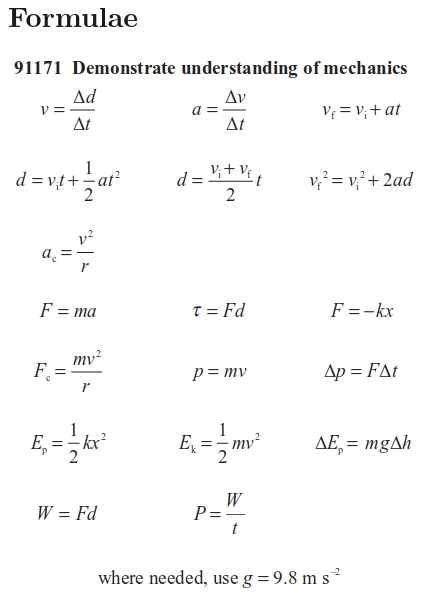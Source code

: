 \documentclass[a4paper]{exam}
\begin{document}
  \clearpage
  \section*{Formulae}
  \includegraphics{mechanics}
\end{document}
